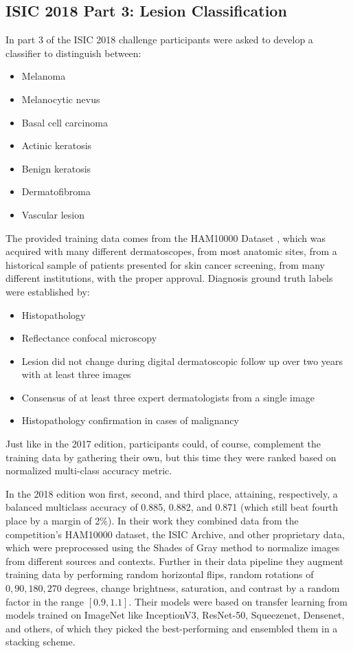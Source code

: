 \subsection{ISIC 2018 Part 3: Lesion Classification}

In part 3 of the ISIC 2018 challenge participants were asked to develop a classifier to distinguish between:

\begin{itemize}
    \item Melanoma
    \item Melanocytic nevus
    \item Basal cell carcinoma
    \item Actinic keratosis
    \item Benign keratosis
    \item Dermatofibroma
    \item Vascular lesion
\end{itemize}

The provided training data comes from the HAM10000 Dataset \cite{ham10000}, which was acquired with many different dermatoscopes, from most anatomic sites, from a historical sample of patients presented for skin cancer screening, from many different institutions, with the proper approval. Diagnosis ground truth labels were established by:

\begin{itemize}
    \item Histopathology
    \item Reflectance confocal microscopy
    \item Lesion did not change during digital dermatoscopic follow up over two years with at least three images
    \item Consensus of at least three expert dermatologists from a single image
    \item Histopathology confirmation in cases of malignancy
\end{itemize}

Just like in the 2017 edition, participants could, of course, complement the training data by gathering their own, but this time they were ranked based on normalized multi-class accuracy metric.

In the 2018 edition \citeauthor{isic2018first} \cite{isic2018first} won first, second, and third place, attaining, respectively, a balanced multiclass accuracy of 0.885, 0.882, and 0.871 (which still beat fourth place by a margin of 2\%). In their work they combined data from the competition's HAM10000 dataset, the ISIC Archive, and other proprietary data, which were preprocessed using the Shades of Gray method to normalize images from different sources and contexts. Further in their data pipeline they augment training data by performing random horizontal flips, random rotations of ${0, 90, 180, 270}$ degrees, change brightness, saturation, and contrast by a random factor in the range $[0.9, 1.1]$. Their models were based on transfer learning from models trained on ImageNet like InceptionV3, ResNet-50, Squeezenet, Densenet, and others, of which they picked the best-performing and ensembled them in a stacking scheme.

